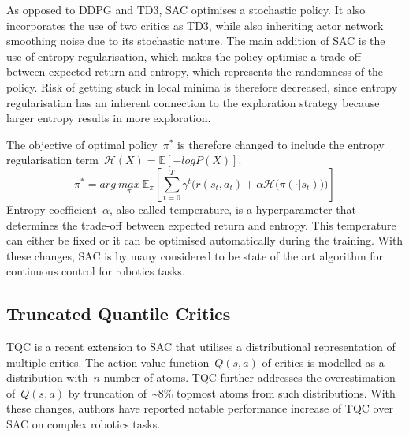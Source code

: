 As opposed to DDPG and TD3, SAC \cite{haarnoja_soft_2018} optimises a stochastic policy. It also incorporates the use of two critics as TD3, while also inheriting actor network smoothing noise due to its stochastic nature. The main addition of SAC is the use of entropy regularisation, which makes the policy optimise a trade-off between expected return and entropy, which represents the randomness of the policy. Risk of getting stuck in local minima is therefore decreased, since entropy regularisation has an inherent connection to the exploration strategy because larger entropy results in more exploration.

The objective of optimal policy~\(\pi^{*}\) is therefore changed to include the entropy regularisation term~\(\mathcal{H}(X) = \mathbb{E} [-log P(X)]\).
\begin{equation}
    \pi^{*} = arg\ \underset{\pi}{max}\ \mathbb{E}_{\pi} \left[ \sum\limits_{t=0}^T \gamma^{t} \bigg( r(s_{t}, a_{t})  + \alpha \mathcal{H}\big(\pi(\cdot \vert s_{t})\big) \bigg) \right]
\end{equation}
Entropy coefficient~\(\alpha\), also called temperature, is a hyperparameter that determines the trade-off between expected return and entropy. This temperature can either be fixed or it can be optimised automatically during the training. With these changes, SAC is by many considered to be state of the art algorithm for continuous control for robotics tasks.


\subsection{Truncated Quantile Critics}

TQC \cite{kuznetsov_controlling_2020} is a recent extension to SAC that utilises a distributional representation of multiple critics. The action-value function~\(Q(s, a)\) of critics is modelled as a distribution with~\(n\)-number of atoms. TQC further addresses the overestimation of~\(Q(s, a)\) by truncation of~\textasciitilde8\% topmost atoms from such distributions. With these changes, authors have reported notable performance increase of TQC over SAC on complex robotics tasks.

